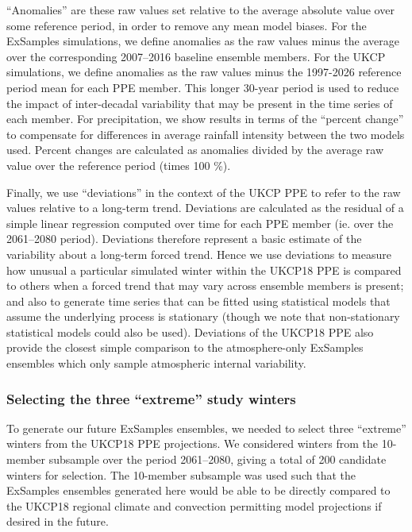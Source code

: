       ``Anomalies'' are these raw values set relative to the average absolute value over some reference period, in order to remove any mean model biases. For the ExSamples simulations, we define anomalies as the raw values minus the average over the corresponding 2007--2016 baseline ensemble members. For the UKCP simulations, we define anomalies as the raw values minus the 1997-2026 reference period mean for each PPE member. This longer 30-year period is used to reduce the impact of inter-decadal variability that may be present in the time series of each member. For precipitation, we show results in terms of the ``percent change'' to compensate for differences in average rainfall intensity between the two models used. Percent changes are calculated as anomalies divided by the average raw value over the reference period (times 100 \%).

      Finally, we use ``deviations'' in the context of the UKCP PPE to refer to the raw values relative to a long-term trend. Deviations are calculated as the residual of a simple linear regression computed over time for each PPE member (ie. over the 2061--2080 period). Deviations therefore represent a basic estimate of the variability about a long-term forced trend. Hence we use deviations to measure how unusual a particular simulated winter within the UKCP18 PPE is compared to others when a forced trend that may vary across ensemble members is present; and also to generate time series that can be fitted using statistical models that assume the underlying process is stationary (though we note that non-stationary statistical models could also be used). Deviations of the UKCP18 PPE also provide the closest simple comparison to the atmosphere-only ExSamples ensembles which only sample atmospheric internal variability.
  
    \subsubsection{Selecting the three ``extreme'' study winters}

      To generate our future ExSamples ensembles, we needed to select three ``extreme'' winters from the UKCP18 PPE projections. We considered winters from the 10-member subsample over the period 2061--2080, giving a total of 200 candidate winters for selection. The 10-member subsample was used such that the ExSamples ensembles generated here would be able to be directly compared to the UKCP18 regional climate and convection permitting model projections if desired in the future.

